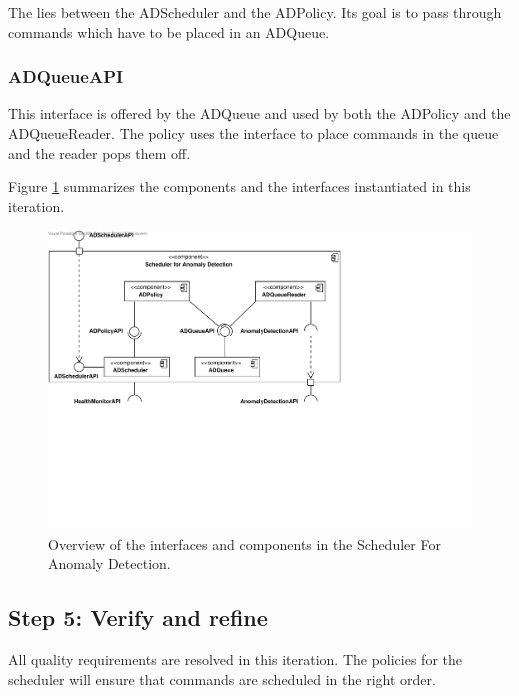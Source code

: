 \npar The  lies between the ADScheduler and the ADPolicy.
Its goal is to pass through commands which have to be placed in an ADQueue.

\subsubsection{ADQueueAPI}

\npar This interface is offered by the ADQueue and used by both the ADPolicy and
the ADQueueReader. The policy uses the interface to place commands in the queue
and the reader pops them off.

\npar Figure \ref{fig:it5/interfaces} summarizes the components and the
interfaces instantiated in this iteration.

\begin{figure}[H]
	\begin{centering}
		\includegraphics[width=\textwidth]{figs/add-it5-interfaces.pdf}
		\caption{Overview of the interfaces and components in the Scheduler For
		Anomaly Detection.}
		\label{fig:it5/interfaces}
	\end{centering}
\end{figure}

\subsection{Step 5: Verify and refine}
\label{add:it5/verification}

\npar All quality requirements are resolved in this iteration. The policies for
the scheduler will ensure that commands are scheduled in the right order. 
